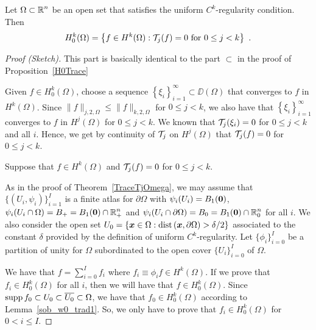 \begin{theorem} \label{H0TraceOmega}
Let $\displaystyle \Omega \subset \mathbb{R}^n$ be an open set that satisfies
the uniform $\displaystyle C^k$-regularity condition.  Then
\[
H^{k}_0(\Omega) = \left\{ f \in H^{k}(\Omega) : \mathcal{T}_j(f) = 0
\ \text{for} \ 0 \leq j < k \right\} \ .
\]
\end{theorem}

\begin{proof}[Proof (Sketch)]
\subI{$\mathbf{\subset}$}  This part is basically identical to the
part $\mathbf{\subset}$ in the proof of Proposition~\ref{H0Trace}

Given $\displaystyle f \in H^k_0(\Omega)$, choose a sequence
$\displaystyle \left\{\xi_i\right\}_{i=1}^\infty \subset \DD(\Omega)$
that converges to $f$ in $\displaystyle H^k(\Omega)$.
Since $\|f\|_{j,2,\Omega} \leq \|f\|_{k,2,\Omega}$ for $0\leq j < k$,
we also have that $\displaystyle \left\{\xi_i\right\}_{i=1}^\infty$
converges to $f$ in $\displaystyle H^j(\Omega)$ 
for $0\leq j < k$.  We known that $\mathcal{T}_j(\xi_i) = 0$ for $0 \leq j < k$
and all $i$.  Hence, we get by continuity of $\mathcal{T}_j$ on
$\displaystyle H^j(\Omega)$ that $\mathcal{T}_j(f) = 0$ for $0 \leq j < k$.

\subI{$\mathbf{\supset}$}
Suppose that $\displaystyle f \in H^k(\Omega)$ and
$\mathcal{T}_j(f) = 0$ for $0 \leq j < k$.

As in the proof of Theorem~\ref{TraceTjOmega}, we may assume that
$\displaystyle \{ (U_i,\psi_i) \}_{i=1}^I$ is a finite atlas for
$\partial \Omega$ with $\psi_i(U_i) = B_1({\bm{0}})$,
$\displaystyle \psi_i(U_i \cap \Omega) = B_+ = B_1({\bm{0}}) \cap \mathbb{R}^n_+$
and
$\displaystyle \psi_i(U_i \cap \partial \Omega) = B_0 = B_1({\bm{0}})
\cap \mathbb{R}^n_0$ for all $i$.  We also consider the open set
$\displaystyle U_0 = \left\{ {\bm{x}} \in \Omega :
\mathrm{dist}\left({\bm{x}},\partial \Omega\right)  > \delta/2 \right\}$
associated to the constant $\delta$ provided by the definition
of uniform $\displaystyle C^k$-regularity.
Let $\displaystyle \{ \phi_i \}_{i=0}^I$ be a partition of unity for
$\Omega$ subordinated to the open cover $\displaystyle \{ U_i \}_{i=0}^I$
of $\Omega$.

We have that $\displaystyle f = \sum_{i=0}^I f_i$ where
$\displaystyle f_i \equiv \phi_i f \in H^k(\Omega)$.  If we prove that
$\displaystyle f_i \in H^k_0(\Omega)$ for all $i$, then we will
have that $\displaystyle f \in H^k_0(\Omega)$.
Since $\operatorname{supp} f_0 \subset U_0 \subset \overline{U_0} \subset \Omega$, we
have that $\displaystyle f_0 \in H^k_0(\Omega)$ according to
Lemma~\ref{sob_w0_trad1}.  So, we only have to prove
that $\displaystyle f_i \in H^k_0(\Omega)$ for $0 < i \leq I$.


\end{proof}
